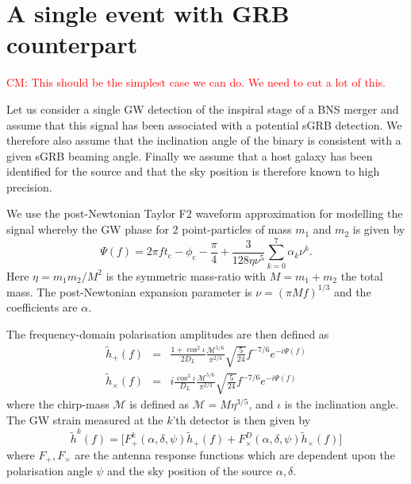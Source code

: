 \documentclass[12pt]{iopart}
\newcommand{\gws}{\tilde{h}}
\newcommand{\cm}[1]{\textcolor{red}{CM: #1}}
\begin{document}
\section{A single event with GRB counterpart\label{sec:single}}

\cm{This should be the simplest case we can do.  We need to cut a lot of this.}

Let us consider a single \ac{GW} detection of the inspiral stage of a \ac{BNS}
merger and assume that this signal has been associated with a potential
\ac{sGRB} detection. We therefore also assume that the inclination angle
of the binary is consistent with a given \ac{sGRB} beaming angle.  Finally we
assume that a host galaxy has been identified for the source and that the sky
position is therefore known to high precision. 
 
We use the post-Newtonian Taylor F2 waveform approximation for modelling the
signal whereby the \ac{GW} phase for 2 point-particles of mass $m_{1}$ and
$m_{2}$ is given by
%
\begin{equation}
\label{eq:gwphase}
  \Psi(f) = 2\pi f t_\mathrm{c} - \phi_{\mathrm{c}} - \frac{\pi}{4} +
\frac{3}{128\eta\nu^{5}}\sum\limits_{k=0}^{7}\alpha_{k}\nu^{k}.
\end{equation}
%
Here $\eta=m_{1}m_{2}/M^{2}$ is the symmetric mass-ratio with $M=m_{1}+m_{2}$
the total mass.  The post-Newtonian expansion parameter is $\nu=(\pi M
f)^{1/3}$ and the coefficients are $\alpha$.

The frequency-domain polarisation amplitudes are then defined as
%
\begin{eqnarray}
  \gws_{+}(f) &=& \frac{1+\cos^{2}\iota}{2D_{L}}
\frac{\mathcal{M}^{5/6}}{\pi^{2/3}}
\sqrt{\frac{5}{24}}f^{-7/6}e^{-i\Psi(f)}\\
  \gws_{\times}(f) &=&
 i\frac{\cos^{2}\iota}{D_{L}}\frac{\mathcal{M}^{5/6}}{\pi^{2/3}}
\sqrt{\frac{5}{24}}f^{-7/6}e^{-i\Psi(f)}
\end{eqnarray}
%
where the chirp-mass $\mathcal{M}$ is defined as $\mathcal{M}=M\eta^{3/5}$,
and $\iota$ is the inclination angle.  The \ac{GW} strain measured
at the $k$'th detector is then given by
%
\begin{equation}
  \label{eq:gravsig}
   \gws^{k}(f) = \big[ F_{+}^{k}(\alpha, \delta, \psi)\gws_{+}(f) +
F_{\times}^D(\alpha, \delta, \psi)\gws_{\times}(f)\big]
\end{equation}
%
where $F_{+},F_{\times}$ are the antenna response functions which are dependent
upon the polarisation angle $\psi$ and the sky position of the source
$\alpha,\delta$.
\end{document}
